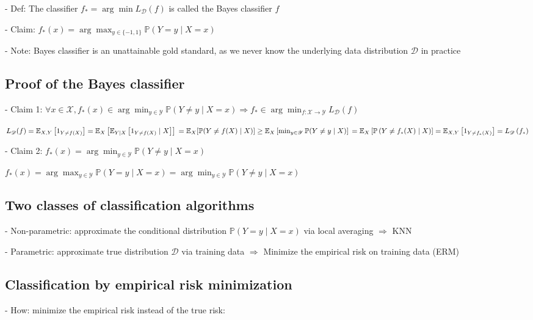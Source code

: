 - Def: The classifier $f_{*}=\arg \min L_{\mathscr{D}}(f)$ is called the Bayes classifier $f$

- Claim:
$
f_{*}(x)=\arg \max _{y \in\{-1,1\}} \mathbb{P}(Y=y \mid X=x)
$

- Note: Bayes classifier is an unattainable gold standard, as we never know the underlying data distribution $\mathscr{D}$ in practice

\subsection*{Proof of the Bayes classifier}
- Claim 1: $\forall x \in \mathscr{X}, f_{*}(x) \in \arg \min _{y \in \mathscr{Y}} \mathbb{P}(Y \neq y \mid X=x) \Longrightarrow f_{*} \in \arg \min _{f: \mathscr{X} \rightarrow \mathscr{Y}} L_{\mathscr{D}}(f)$

$
L_{\mathscr{D}}(f)=\mathbb{E}_{X, Y}\left[1_{Y \neq f(X)}\right] =\mathbb{E}_{X}\left[\mathbb{E}_{Y \mid X}\left[1_{Y \neq f(X)} \mid X\right]\right] \\
=\mathbb{E}_{X}[\mathbb{P}(Y \neq f(X) \mid X)] \\
\geq \mathbb{E}_{X}\left[\min _{y \in \mathscr{Y}} \mathbb{P}(Y \neq y \mid X)\right] \\
=\mathbb{E}_{X}\left[\mathbb{P}\left(Y \neq f_{*}(X) \mid X\right)\right]=\mathbb{E}_{X, Y}\left[1_{Y \neq f_{*}(X)}\right]=L_{\mathscr{D}}\left(f_{*}\right)
$

- Claim 2: $f_{*}(x)=\arg \min _{y \in \mathscr{Y}} \mathbb{P}(Y \neq y \mid X=x)$

$
f_{*}(x)=\arg \max _{y \in \mathscr{Y}} \mathbb{P}(Y=y \mid X=x)=\arg \min _{y \in \mathscr{Y}} \mathbb{P}(Y \neq y \mid X=x)
$

\subsection*{Two classes of classification algorithms}
- Non-parametric: approximate the conditional distribution $\mathbb{P}(Y=y \mid X=x)$ via local averaging $\Rightarrow$ KNN

- Parametric: approximate true distribution $\mathscr{D}$ via training data $\Rightarrow$ Minimize the empirical risk on training data (ERM)

\subsection*{Classification by empirical risk minimization}
- How: minimize the empirical risk instead of the true risk:

